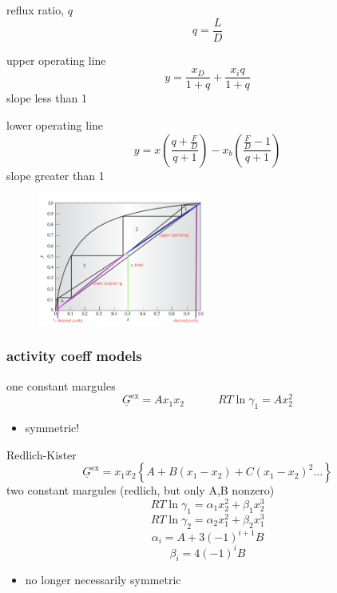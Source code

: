 \documentclass{article}
\begin{document}
\begin{minipage}[t]{0.3\textwidth}
    reflux ratio, $q$
    \[q = \frac{L}{D}\]
\end{minipage}
\begin{minipage}[t]{0.3\textwidth}
    upper operating line
    \[y = \frac{x_{D}}{1+q} + \frac{x_{i}q}{1+q}\]
    slope less than 1
\end{minipage}
\begin{minipage}[t]{0.3\textwidth}
    lower operating line
    \[y = x \left(\frac{ q+\frac{F}{D}}{q+1} \right) - x_{b} \left( \frac{\frac{F}{D} -1}{q+1} \right)\]
    slope greater than 1
\end{minipage}

\begin{figure}[H]
    \centering
    \includegraphics[width=0.5\textwidth]{mct_method.png}
\end{figure}

\begin{minipage}[t]{0.48\textwidth}
    \subsubsection*{activity coeff models}
    one constant margules
    \[ \underline{G}^{\text{ex}} = A x_1 x_2 \hspace{3em} RT \ln \gamma_1 = Ax_2^2 \]
    \begin{itemize}
        \item symmetric!
    \end{itemize}
\end{minipage}
\begin{minipage}[t]{0.48\textwidth}
    Redlich-Kister
    \[ \underline{G}^{\text{ex}} =  x_1 x_2 \left\{ A + B (x_1 - x_2) + C (x_1 - x_2)^2  \dots \right\}  \]
    two constant margules (redlich, but only A,B nonzero)
    \[RT \ln \gamma_1 = \alpha_1 x_2^2 + \beta_1 x_2^3 \]
    \[RT \ln \gamma_2 = \alpha_2 x_1^2 + \beta_2 x_1^3 \]
    \[  \alpha_i = A + 3(-1)^{i+1}B  \]
    \[  \beta_i = 4(-1)^i B \]
    \begin{itemize}
        \item no longer necessarily symmetric
    \end{itemize}
\end{minipage}
\end{document}
